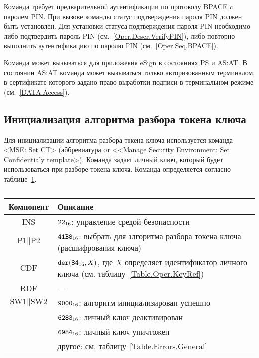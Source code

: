 Команда требует предварительной аутентификации по 
протоколу BPACE c паролем PIN. 
При вызове команды статус подтверждения 
пароля PIN должен быть установлен.
Для установки статуса подтверждения пароля PIN 
необходимо либо подтвердить пароль PIN (см.~\ref{Oper.Descr.VerifyPIN}), 
либо повторно выполнить аутентификацию по паролю PIN (см.~\ref{Oper.Seq.BPACE}).

Команда может вызываться для приложения eSign в 
состояниях PS и AS:AT. В состоянии AS:AT команда 
может вызываться только авторизованным терминалом,
в сертификате которого задано право 
выработки подписи в терминальном режиме (см.~\ref{DATA.Access}).


\subsection{Инициализация алгоритма разбора токена ключа}
\label{Oper.Descr.SetCT}

Для инициализации алгоритма разбора токена ключа
используется команда <MSE: Set CT> 
(аббревиатура от <<Manage Security Environment: Set Confidentialy template>).
Команда задает личный ключ, который будет использоваться при разборе токена ключа.
Команда определяется согласно таблице~\ref{Table.Oper.SetCTCmd}.

\begin{table}[hbt]
\caption{}\label{Table.Oper.SetCTCmd}
\begin{tabular}{|c|p{14cm}|}
\hline
Компонент & Описание \\
\hline
\hline
INS & $\texttt{22}_{16}$: управление средой безопасности\\ 
\hline
$\text{P1} \parallel\text{P2}$ & $\texttt{41B8}_{16}$: 
выбрать для алгоритма разбора токена ключа
(расшифрования ключа) \\
\hline
CDF & 
$\texttt{der}(\texttt{84}_{16}, X)$, 
где $X$ определяет идентификатор личного ключа
(см. таблицу~\ref{Table.Oper.KeyRef})\\
\hline
RDF &  --- \\
\hline
$\text{SW1} \parallel \text{SW2}$ & 
$\texttt{9000}_{16}$: алгоритм инициализирован успешно \\
  & $\texttt{6283}_{16}$: личный ключ деактивирован \\
  & $\texttt{6984}_{16}$: личный ключ уничтожен \\
  & другое: см. таблицу~\ref{Table.Errors.General} \\
\hline
\end{tabular}
\end{table}

